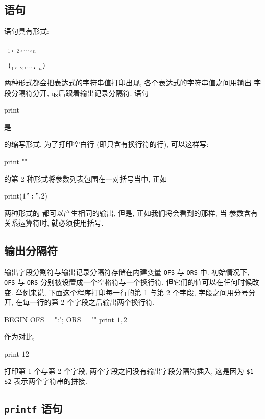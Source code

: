 \subsection{\print 语句}
\label{subsec:the_print_statement}
\print 语句具有形式:
\begin{pattern}
    \print\ \expr$_1$\verb',' \expr$_2$\verb','...\verb','\expr$_n$ \par
    \print\ \verb'('\expr$_1$\verb',' \expr$_2$\verb','...\verb','
    \expr$_n$\verb')'
\end{pattern}
两种形式都会把表达式的字符串值打印出现, 各个表达式的字符串值之间用输出
字段分隔符分开, 最后跟着输出记录分隔符. 语句 
\begin{awkcode}
    print
\end{awkcode}
是
的缩写形式. 为了打印空白行 (即只含有换行符的行), 可以这样写:
\begin{awkcode}
    print ""
\end{awkcode}
\print 的第 2 种形式将参数列表包围在一对括号当中, 正如 
\begin{awkcode}
    print($1 ":", $2)
\end{awkcode}
两种形式的 \print 都可以产生相同的输出, 但是, 正如我们将会看到的那样, 当
参数含有关系运算符时, 就必须使用括号.

\subsection{输出分隔符}
\label{subsec:output_separators}

输出字段分割符与输出记录分隔符存储在内建变量 \verb'OFS' 与 \verb'ORS' 中.
初始情况下, \verb'OFS' 与 \verb'ORS' 分别被设置成一个空格符与一个换行符,
但它们的值可以在任何时候改变. 举例来说, 下面这个程序打印每一行的第 1 与第 
2 个字段, 字段之间用分号分开, 在每一行的第 2 个字段之后输出两个换行符.
\begin{awkcode}
    BEGIN   { OFS = ":"; ORS = "\n\n" }
            { print $1, $2 }
\end{awkcode}
作为对比,
\begin{awkcode}
    { print $1 $2 }
\end{awkcode}
打印第 1 个与第 2 个字段, 两个字段之间没有输出字段分隔符插入, 这是因为 
\verb'$1 $2' 表示两个字符串的拼接.

\subsection{\texttt{printf} 语句}
\label{subsec:the_printf_statement}

